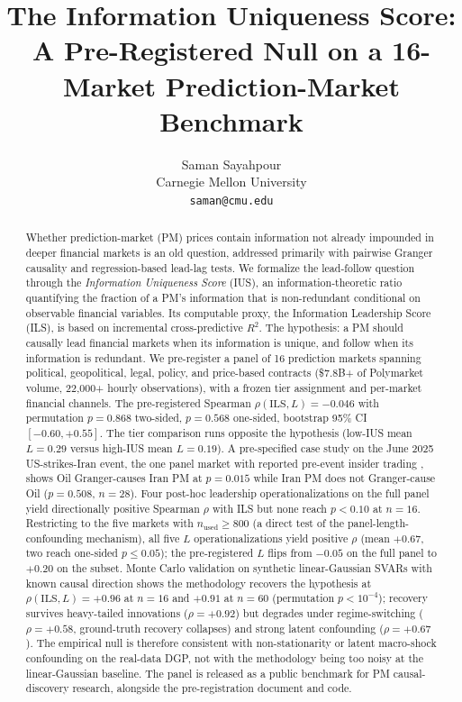 \documentclass{article}
\title{The Information Uniqueness Score:\\
A Pre-Registered Null on a 16-Market Prediction-Market Benchmark}
\author{%
  Saman Sayahpour \\
  Carnegie Mellon University \\
  \texttt{saman@cmu.edu} \\
}
\begin{document}
\maketitle

\begin{abstract}
Whether prediction-market (PM) prices contain information not already impounded in deeper financial markets is an old question, addressed primarily with pairwise Granger causality and regression-based lead-lag tests. We formalize the lead-follow question through the \emph{Information Uniqueness Score} (IUS), an information-theoretic ratio quantifying the fraction of a PM's information that is non-redundant conditional on observable financial variables. Its computable proxy, the Information Leadership Score (ILS), is based on incremental cross-predictive $R^2$. The hypothesis: a PM should causally lead financial markets when its information is unique, and follow when its information is redundant. We pre-register a panel of 16 prediction markets spanning political, geopolitical, legal, policy, and price-based contracts (\$7.8B+ of Polymarket volume, 22{,}000+ hourly observations), with a frozen tier assignment and per-market financial channels. The pre-registered Spearman $\rho(\mathrm{ILS}, L) = -0.046$ with permutation $p = 0.868$ two-sided, $p = 0.568$ one-sided, bootstrap 95\% CI $[-0.60, +0.55]$. The tier comparison runs opposite the hypothesis (low-IUS mean $L = 0.29$ versus high-IUS mean $L = 0.19$). A pre-specified case study on the June 2025 US-strikes-Iran event, the one panel market with reported pre-event insider trading \citep{chainalysis2025iran}, shows Oil Granger-causes Iran PM at $p = 0.015$ while Iran PM does not Granger-cause Oil ($p = 0.508$, $n = 28$). Four post-hoc leadership operationalizations on the full panel yield directionally positive Spearman $\rho$ with ILS but none reach $p < 0.10$ at $n = 16$. Restricting to the five markets with $n_\text{used} \ge 800$ (a direct test of the panel-length-confounding mechanism), all five $L$ operationalizations yield positive $\rho$ (mean $+0.67$, two reach one-sided $p \le 0.05$); the pre-registered $L$ flips from $-0.05$ on the full panel to $+0.20$ on the subset. Monte Carlo validation on synthetic linear-Gaussian SVARs with known causal direction shows the methodology recovers the hypothesis at $\rho(\mathrm{ILS}, L) = +0.96$ at $n = 16$ and $+0.91$ at $n = 60$ (permutation $p < 10^{-4}$); recovery survives heavy-tailed innovations ($\rho = +0.92$) but degrades under regime-switching ($\rho = +0.58$, ground-truth recovery collapses) and strong latent confounding ($\rho = +0.67$). The empirical null is therefore consistent with non-stationarity or latent macro-shock confounding on the real-data DGP, not with the methodology being too noisy at the linear-Gaussian baseline. The panel is released as a public benchmark for PM causal-discovery research, alongside the pre-registration document and code.
\end{abstract}
\end{document}
